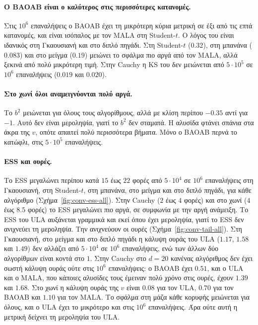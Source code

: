 \paragraph{Ο BAOAB είναι ο καλύτερος στις περισσότερες κατανομές.}
Στις $10^6$ επαναλήψεις ο BAOAB έχει τη μικρότερη κύρια μετρική σε έξι από τις επτά
κατανομές, και είναι ισόπαλος με τον MALA στη Student-$t$. Ο λόγος του είναι ιδανικός
στη Γκαουσιανή και στο διπλό πηγάδι. Στη Student-$t$ ($0.32$), στη μπανάνα ($0.083$)
και στο μείγμα ($0.19$) μειώνει το σφάλμα πιο αργά από τον MALA, αλλά ξεκινά από
πολύ μικρότερη τιμή. Στην Cauchy η KS του δεν μειώνεται από $5 \cdot 10^5$ σε $10^6$
επαναλήψεις ($0.019$ και $0.020$).

\paragraph{Στο χωνί όλοι αναμειγνύονται πολύ αργά.}
Το $b^2$ μειώνεται για όλους τους αλγορίθμους, αλλά με κλίση περίπου $-0.35$ αντί για
$-1$. Αυτό δεν είναι μεροληψία, γιατί το $b^2$ δεν σταματά. Η αλυσίδα φτάνει σπάνια
στα άκρα της $v$, οπότε απαιτεί πολύ περισσότερα βήματα. Μόνο ο BAOAB περνά το κατώφλι,
στις $5 \cdot 10^5$ επαναλήψεις.

\paragraph{ESS και ουρές.}
Το ESS μεγαλώνει περίπου κατά $15$ έως $22$ φορές από $5 \cdot 10^4$ σε $10^6$
επαναλήψεις στη Γκαουσιανή, στη Student-$t$, στη μπανάνα, στο μείγμα και στο διπλό
πηγάδι, για κάθε αλγόριθμο (Σχήμα~\ref{fig:conv-ess-all}). Στην Cauchy ($2$ έως $4$
φορές) και στο χωνί ($4$ έως $8.5$ φορές) το ESS μεγαλώνει πιο αργά, σε συμφωνία με την
αργή ανάμειξη. Το ESS του ULA αυξάνεται γραμμικά και εκεί όπου έχει μεροληψία, γιατί το ESS δεν
ανιχνεύει τη μεροληψία. Την ανιχνεύουν οι ουρές (Σχήμα~\ref{fig:conv-tail-all}). Στη Γκαουσιανή,
στο μείγμα και στο διπλό πηγάδι η κάλυψη ουράς του ULA ($1.17$, $1.58$ και $1.49$) δεν
αλλάζει από $5 \cdot 10^4$ σε $10^6$ επαναλήψεις, ενώ των άλλων δύο αλγορίθμων είναι
κοντά στο $1$. Στην Cauchy στο $d=20$ κανένας αλγόριθμος δεν έχει σωστή κάλυψη ουράς
ούτε στις $10^6$ επαναλήψεις: ο BAOAB έχει $0.51$, και ο ULA και ο MALA, που κάποιες
αλυσίδες τους έμειναν πολύ χρόνο στις ουρές, έχουν $1.39$ και $1.68$. Στο χωνί η κάλυψη
ουράς της $v$ είναι $0.08$ για τον ULA, $0.70$ για τον BAOAB και $1.10$ για τον MALA.
Το σφάλμα στη μάζα κάθε κορυφής μειώνεται για όλους, και ο ULA έχει το μικρότερο και
στις $10^6$ επαναλήψεις. Άρα ούτε αυτή η μετρική δείχνει τη μεροληψία του ULA.

